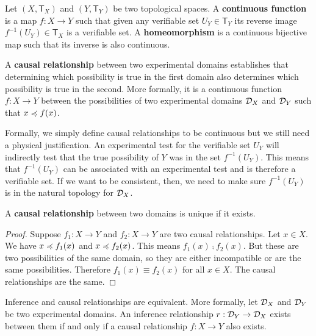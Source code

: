 \documentclass[11pt,letterpaper,fleqn]{memoir} %
\begin{document}
\begin{mathSection}
	\begin{defn}
		Let $(X, \mathsf{T}_X)$ and $(Y, \mathsf{T}_Y)$ be two topological spaces. A \textbf{continuous function} is a map $f: X \to Y$ such that given any verifiable set $U_Y \in \mathsf{T}_Y$ its reverse image $f^{-1}(U_Y) \in \mathsf{T}_X$ is a verifiable set. A \textbf{homeomorphism} is a continuous bijective map such that its inverse is also continuous.
	\end{defn}
	\begin{defn}
		A \textbf{causal relationship} between two experimental domains establishes that determining which possibility is true in the first domain also determines which possibility is true in the second. More formally, it is a continuous function $f : X \to Y$ between the possibilities of two experimental domains $\mathcal{D}_X$ and $\mathcal{D}_Y$ such that $x \preccurlyeq f(x)$.
	\end{defn}
	\begin{justification}
		Formally, we simply define causal relationships to be continuous but we still need a physical justification. An experimental test for the verifiable set $U_Y$ will indirectly test that the true possibility of $Y$ was in the set $f^{-1}(U_Y)$. This means that $f^{-1}(U_Y)$ can be associated with an experimental test and is therefore a verifiable set. If we want to be consistent, then, we need to make sure $f^{-1}(U_Y)$ is in the natural topology for $\mathcal{D}_X$.
	\end{justification}
	\begin{coro}
		A \textbf{causal relationship} between two domains is unique if it exists.
	\end{coro}\label{prop_causal_relationship_unique}
	\begin{proof}
		Suppose $f_1 : X \to Y$ and $f_2 : X \to Y$ are two causal relationships. Let $x \in X$. We have $x \preccurlyeq f_1(x)$ and $x \preccurlyeq f_2(x)$. This means $f_1(x) \comp f_2(x)$. But these are two possibilities of the same domain, so they are either incompatible or are the same possibilities. Therefore $f_1(x) \equiv f_2(x)$ for all $x \in X$. The causal relationships are the same.
	\end{proof}
	\begin{thrm}
		Inference and causal relationships are equivalent. More formally, let $\mathcal{D}_X$ and $\mathcal{D}_Y$ be two experimental domains. An inference relationship $r: \mathcal{D}_Y \to \mathcal{D}_X$ exists between them if and only if a causal relationship $f: X \to Y$ also exists.

\end{thrm}
\end{mathSection}
\end{document}
